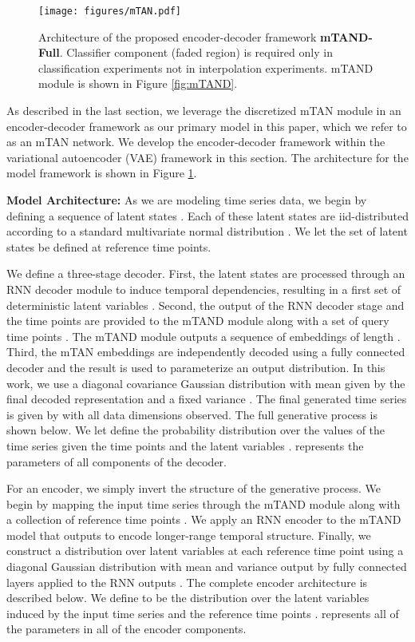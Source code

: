 \documentclass{article} \usepackage{iclr2021_conference,times}
\begin{document}
\begin{figure}[t]
\centering
\texttt{[image: figures/mTAN.pdf]}
\caption{Architecture of the proposed encoder-decoder framework \textbf{mTAND-Full}. Classifier component (faded region) is required only in classification experiments not in interpolation experiments. mTAND module is shown in Figure \ref{fig:mTAND}.}
\label{fig:complete_model}
\end{figure}

\label{sec:enc-dec}
As described in the last section, we leverage the discretized mTAN module in an encoder-decoder framework as our primary model in this paper, which we refer to as an mTAN network. We develop the encoder-decoder framework within the variational autoencoder (VAE) framework in this section. The architecture for the model framework is shown in Figure \ref{fig:complete_model}.

\textbf{Model Architecture:} As we are modeling time series data, we begin by defining a sequence of latent states . Each of these latent states are iid-distributed according to a standard multivariate normal distribution . We let the set of latent states be  defined at  reference time points. 

We define a three-stage decoder. First, the latent states are processed through an RNN decoder module to induce temporal dependencies, resulting in a first set of deterministic latent variables . Second, the output of the RNN decoder stage and the  time points  are provided to the mTAND module along with a set of  query time points . The mTAND module outputs a sequence of embeddings  of length . Third, the mTAN embeddings are independently decoded using a fully connected decoder  and the result is used to parameterize an output distribution. In this work, we use a diagonal covariance Gaussian distribution with mean given by the final decoded representation and a fixed variance . The final generated time series is given by  with all data dimensions observed. The full generative process  is shown below. We let  define the probability distribution over the values of the time series  given the time points  and the latent variables .  represents the parameters of all components of  the decoder.  

For an encoder, we simply invert the structure of the generative process. We begin by mapping the input time series  through the mTAND module along with a collection of  reference time points . We apply an RNN encoder to the mTAND model that outputs  to encode longer-range temporal structure. Finally, we construct a distribution over latent variables at each reference time point using a diagonal Gaussian distribution with mean and variance output by fully connected layers applied to the RNN outputs . The complete encoder architecture is described below. We define  to be the distribution over the latent variables induced by the input time series  and the reference time points .  represents all of the parameters in all of the encoder components. 
\end{document}
